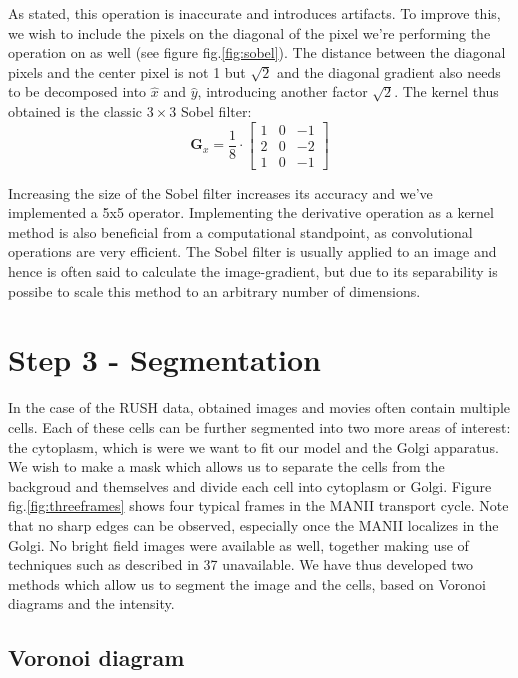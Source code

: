 \documentclass[12pt,a4paper,]{Dissertate}
\begin{document}
As stated, this operation is inaccurate and introduces artifacts. To
improve this, we wish to include the pixels on the diagonal of the pixel
we're performing the operation on as well (see figure
fig.\ref{fig:sobel}). The distance between the diagonal pixels and the
center pixel is not 1 but \(\sqrt{2}\) and the diagonal gradient also
needs to be decomposed into \(\hat{x}\) and \(\hat{y}\), introducing
another factor \(\sqrt{2}\). The kernel thus obtained is the classic
\(3\times3\) Sobel filter: \[
\mathbf G_x=\frac{1}{8}\cdot
\begin{bmatrix}
1 & 0 & -1\\
2 & 0 & -2\\
1 & 0 & -1
\end{bmatrix}
\]

Increasing the size of the Sobel filter increases its accuracy and we've
implemented a 5x5 operator. Implementing the derivative operation as a
kernel method is also beneficial from a computational standpoint, as
convolutional operations are very efficient. The Sobel filter is usually
applied to an image and hence is often said to calculate the
image-gradient, but due to its separability is possibe to scale this
method to an arbitrary number of dimensions.

\hypertarget{step-3---segmentation}{%
\section{Step 3 - Segmentation}\label{step-3---segmentation}}

In the case of the RUSH data, obtained images and movies often contain
multiple cells. Each of these cells can be further segmented into two
more areas of interest: the cytoplasm, which is were we want to fit our
model and the Golgi apparatus. We wish to make a mask which allows us to
separate the cells from the backgroud and themselves and divide each
cell into cytoplasm or Golgi. Figure fig.\ref{fig:threeframes} shows
four typical frames in the MANII transport cycle. Note that no sharp
edges can be observed, especially once the MANII localizes in the Golgi.
No bright field images were available as well, together making use of
techniques such as described in 37 unavailable. We have thus developed
two methods which allow us to segment the image and the cells, based on
Voronoi diagrams and the intensity.

\hypertarget{voronoi-diagram}{%
\subsection{Voronoi diagram}\label{voronoi-diagram}}
\end{document}
